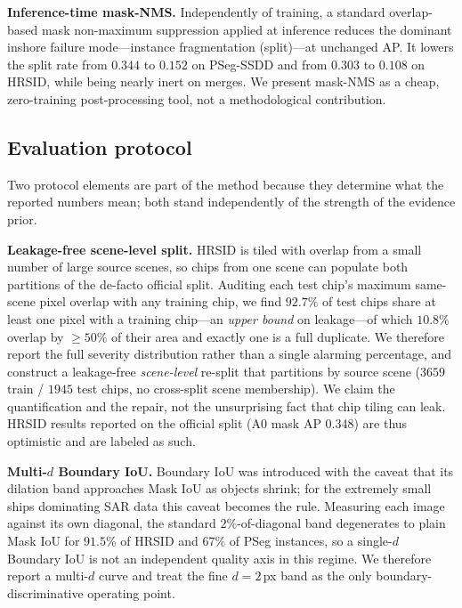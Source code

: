 \textbf{Inference-time mask-NMS.} Independently of training, a standard overlap-based mask non-maximum suppression applied at inference reduces the dominant inshore failure mode---instance fragmentation (split)---at unchanged AP. It lowers the split rate from $0.344$ to $0.152$ on PSeg-SSDD and from $0.303$ to $0.108$ on HRSID, while being nearly inert on merges. We present mask-NMS as a cheap, zero-training post-processing tool, not a methodological contribution.

\subsection{Evaluation protocol}
\label{sec:protocol}
Two protocol elements are part of the method because they determine what the reported numbers mean; both stand independently of the strength of the evidence prior.

\textbf{Leakage-free scene-level split.} HRSID \cite{wei2020hrsid} is tiled with overlap from a small number of large source scenes, so chips from one scene can populate both partitions of the de-facto official split. Auditing each test chip's maximum same-scene pixel overlap with any training chip, we find $92.7\%$ of test chips share at least one pixel with a training chip---an \emph{upper bound} on leakage---of which $10.8\%$ overlap by $\ge\!50\%$ of their area and exactly one is a full duplicate. We therefore report the full severity distribution rather than a single alarming percentage, and construct a leakage-free \emph{scene-level} re-split that partitions by source scene ($3659$ train / $1945$ test chips, no cross-split scene membership). We claim the quantification and the repair, not the unsurprising fact that chip tiling can leak. HRSID results reported on the official split (A0 mask AP $0.348$) are thus optimistic and are labeled as such.

\textbf{Multi-$d$ Boundary IoU.} Boundary IoU \cite{cheng2021boundary} was introduced with the caveat that its dilation band approaches Mask IoU as objects shrink; for the extremely small ships dominating SAR data this caveat becomes the rule. Measuring each image against its own diagonal, the standard $2\%$-of-diagonal band degenerates to plain Mask IoU for $91.5\%$ of HRSID and $67\%$ of PSeg instances, so a single-$d$ Boundary IoU is not an independent quality axis in this regime. We therefore report a multi-$d$ curve and treat the fine $d\!=\!2$\,px band as the only boundary-discriminative operating point.

